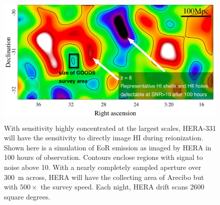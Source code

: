 \documentclass[preprint]{aastex}
\begin{document}
\begin{figure}[t]\centering
\includegraphics[height=2.5in]{plots/Imaging/HERA_331_z8_SNR_annotated.jpg}%
\caption{\small
With sensitivity highly concentrated at the largest scales,
HERA-331 will have the sensitivity to directly image HI during reionization.  Shown here is a simulation of EoR emission \citep{mcquinn_et_al2007} as imaged by HERA in 100 hours of observation.
Contours enclose regions with signal to noise above 10.
With a nearly completely sampled aperture over 300~m across, HERA will have the collecting area of Arecibo but with $500\times$ the survey speed. Each night, HERA drift scans 2600 square degrees.%
}  \label{fig:imaging}
\end{figure}

%
\end{document}
